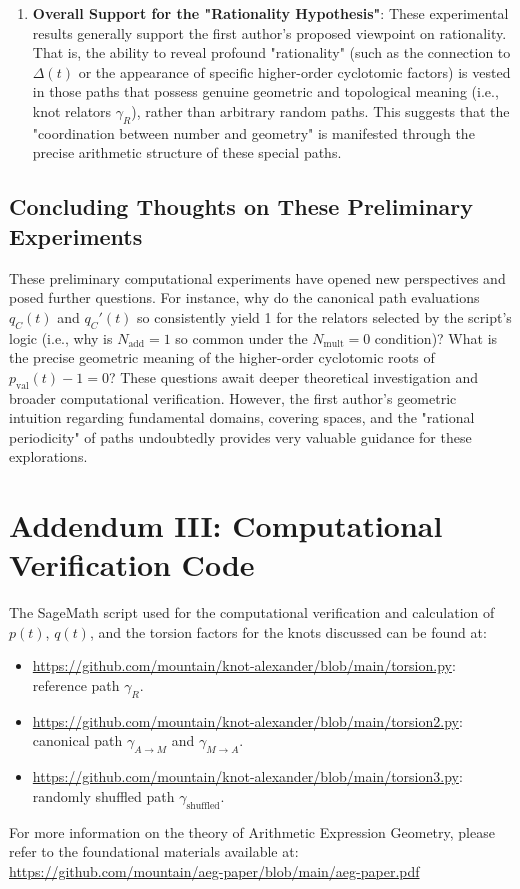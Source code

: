 \documentclass{article}[a4paper,12pt]
\begin{document}
\begin{enumerate}
\begin{itemize}
    \end{itemize}
    \item \textbf{Overall Support for the "Rationality Hypothesis"}: These experimental results generally support the first author's proposed viewpoint on rationality. That is, the ability to reveal profound "rationality" (such as the connection to $\Delta(t)$ or the appearance of specific higher-order cyclotomic factors) is vested in those paths that possess genuine geometric and topological meaning (i.e., knot relators $\gamma_R$), rather than arbitrary random paths. This suggests that the "coordination between number and geometry" is manifested through the precise arithmetic structure of these special paths.
\end{enumerate}

\subsection*{Concluding Thoughts on These Preliminary Experiments}
These preliminary computational experiments have opened new perspectives and posed further questions. For instance, why do the canonical path evaluations $q_C(t)$ and $q_C'(t)$ so consistently yield 1 for the relators selected by the script's logic (i.e., why is $N_{\text{add}}=1$ so common under the $N_{\text{mult}}=0$ condition)? What is the precise geometric meaning of the higher-order cyclotomic roots of $p_{\text{val}}(t)-1=0$? These questions await deeper theoretical investigation and broader computational verification. However, the first author's geometric intuition regarding fundamental domains, covering spaces, and the "rational periodicity" of paths undoubtedly provides very valuable guidance for these explorations.

\newpage

\section{Addendum III: Computational Verification Code}

The SageMath script used for the computational verification and calculation of $p(t)$, $q(t)$, and the torsion factors for the knots discussed can be found at:
\begin{itemize}
    \item \url{https://github.com/mountain/knot-alexander/blob/main/torsion.py}: reference path $\gamma_R$.
    \item \url{https://github.com/mountain/knot-alexander/blob/main/torsion2.py}: canonical path $\gamma_{A \to M}$ and $\gamma_{M \to A}$.
    \item \url{https://github.com/mountain/knot-alexander/blob/main/torsion3.py}: randomly shuffled path $\gamma_{\text{shuffled}}$.
\end{itemize}


For more information on the theory of Arithmetic Expression Geometry, please refer to the foundational materials available at:
\url{https://github.com/mountain/aeg-paper/blob/main/aeg-paper.pdf}
\end{document}
